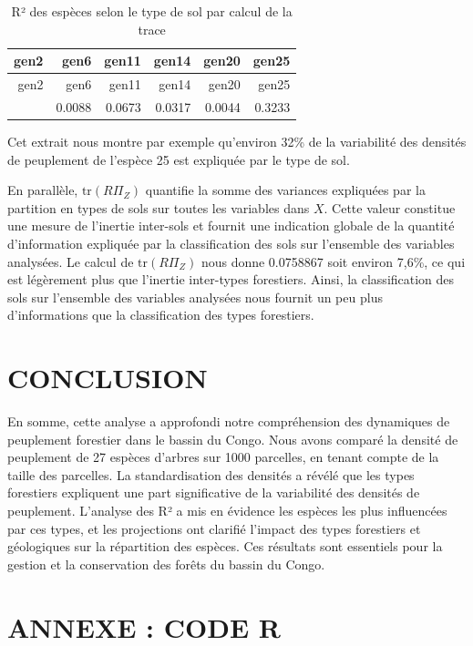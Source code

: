 \documentclass[
]{article}
\begin{document}
\begin{longtable}[]{@{}rrrrrr@{}}
\caption{R² des espèces selon le type de sol par calcul de la
trace}\tabularnewline
\toprule\noalign{}
gen2 & gen6 & gen11 & gen14 & gen20 & gen25 \\
\midrule\noalign{}
\endfirsthead
\toprule\noalign{}
gen2 & gen6 & gen11 & gen14 & gen20 & gen25 \\
\midrule\noalign{}
\endhead
\bottomrule\noalign{}
\endlastfoot
0.0175 & 0.0088 & 0.0673 & 0.0317 & 0.0044 & 0.3233 \\
\end{longtable}

Cet extrait nous montre par exemple qu'environ 32\% de la variabilité
des densités de peuplement de l'espèce 25 est expliquée par le type de
sol.

En parallèle, \(\text{tr}(R \Pi_Z)\) quantifie la somme des variances
expliquées par la partition en types de sols sur toutes les variables
dans \(X\). Cette valeur constitue une mesure de l'inertie inter-sols et
fournit une indication globale de la quantité d'information expliquée
par la classification des sols sur l'ensemble des variables analysées.
Le calcul de \(\text{tr}(R \Pi_Z)\) nous donne 0.0758867 soit environ
7,6\%, ce qui est légèrement plus que l'inertie inter-types forestiers.
Ainsi, la classification des sols sur l'ensemble des variables analysées
nous fournit un peu plus d'informations que la classification des types
forestiers.

\hypertarget{conclusion}{%
\section{CONCLUSION}\label{conclusion}}

En somme, cette analyse a approfondi notre compréhension des dynamiques
de peuplement forestier dans le bassin du Congo. Nous avons comparé la
densité de peuplement de 27 espèces d'arbres sur 1000 parcelles, en
tenant compte de la taille des parcelles. La standardisation des
densités a révélé que les types forestiers expliquent une part
significative de la variabilité des densités de peuplement. L'analyse
des R² a mis en évidence les espèces les plus influencées par ces types,
et les projections ont clarifié l'impact des types forestiers et
géologiques sur la répartition des espèces. Ces résultats sont
essentiels pour la gestion et la conservation des forêts du bassin du
Congo.

\newpage

\hypertarget{annexe}{%
\section{ANNEXE : CODE R}\label{annexe}}
\end{document}
